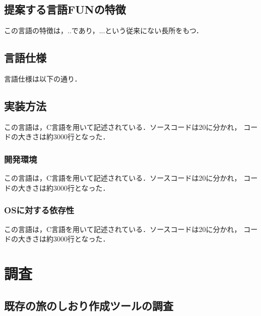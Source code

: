 \documentclass{funthesis}
\begin{document}
\section{提案する言語FUNの特徴}

この言語の特徴は，..であり，...という従来にない長所をもつ．

\section{言語仕様}

言語仕様は以下の通り．


\section{実装方法}

この言語は，C言語を用いて記述されている．ソースコードは20に分かれ，
コードの大きさは約3000行となった．

\subsection{開発環境}

この言語は，C言語を用いて記述されている．ソースコードは20に分かれ，
コードの大きさは約3000行となった．

\subsection{OSに対する依存性}

この言語は，C言語を用いて記述されている．ソースコードは20に分かれ，
コードの大きさは約3000行となった．


\chapter{調査}%

\section{既存の旅のしおり作成ツールの調査}
\end{document}
